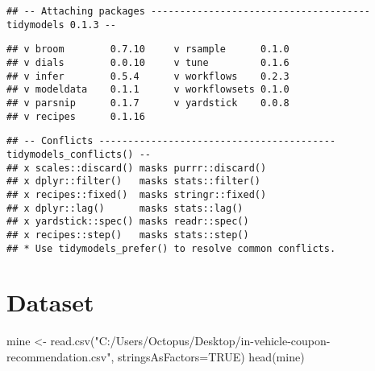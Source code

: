 \documentclass[
]{article}
\newenvironment{Shaded}{\begin{snugshade}}{\end{snugshade}}
\newcommand{\AttributeTok}[1]{\textcolor[rgb]{0.77,0.63,0.00}{#1}}
\newcommand{\ConstantTok}[1]{\textcolor[rgb]{0.00,0.00,0.00}{#1}}
\newcommand{\FunctionTok}[1]{\textcolor[rgb]{0.00,0.00,0.00}{#1}}
\newcommand{\NormalTok}[1]{#1}
\newcommand{\OtherTok}[1]{\textcolor[rgb]{0.56,0.35,0.01}{#1}}
\newcommand{\StringTok}[1]{\textcolor[rgb]{0.31,0.60,0.02}{#1}}
\begin{document}
\begin{verbatim}
## -- Attaching packages -------------------------------------- tidymodels 0.1.3 --
\end{verbatim}

\begin{verbatim}
## v broom        0.7.10     v rsample      0.1.0 
## v dials        0.0.10     v tune         0.1.6 
## v infer        0.5.4      v workflows    0.2.3 
## v modeldata    0.1.1      v workflowsets 0.1.0 
## v parsnip      0.1.7      v yardstick    0.0.8 
## v recipes      0.1.16
\end{verbatim}

\begin{verbatim}
## -- Conflicts ----------------------------------------- tidymodels_conflicts() --
## x scales::discard() masks purrr::discard()
## x dplyr::filter()   masks stats::filter()
## x recipes::fixed()  masks stringr::fixed()
## x dplyr::lag()      masks stats::lag()
## x yardstick::spec() masks readr::spec()
## x recipes::step()   masks stats::step()
## * Use tidymodels_prefer() to resolve common conflicts.
\end{verbatim}

\hypertarget{dataset}{%
\section{Dataset}\label{dataset}}

\begin{Shaded}
\begin{Highlighting}[]
\NormalTok{mine }\OtherTok{\textless{}{-}} \FunctionTok{read.csv}\NormalTok{(}\StringTok{"C:/Users/Octopus/Desktop/in{-}vehicle{-}coupon{-}recommendation.csv"}\NormalTok{, }\AttributeTok{stringsAsFactors=}\ConstantTok{TRUE}\NormalTok{)}
\FunctionTok{head}\NormalTok{(mine)}
\end{Highlighting}
\end{Shaded}
\end{document}
